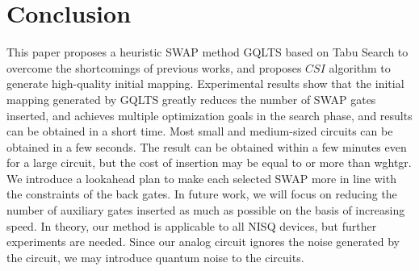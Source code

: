 \documentclass[runningheads]{llncs}
\begin{document}
 \section{Conclusion}
 \label{Conclusion}
 This paper proposes a heuristic SWAP method GQLTS based on Tabu Search to 
 overcome the shortcomings of previous works, 
 and proposes $CSI$  algorithm to generate high-quality initial mapping. 
 Experimental results show that the initial mapping generated by GQLTS greatly 
 reduces the number of SWAP gates inserted, 
 and achieves multiple optimization goals in the search phase, 
 and results can be obtained in a short time. 
 Most small and medium-sized circuits can be obtained in a few seconds. 
 The result can be obtained within a few minutes even for a large circuit, 
 but the cost of insertion may be equal to or more than wghtgr. 
 We introduce a lookahead plan to make each selected SWAP more in line with the 
 constraints of the back gates. 
 In future work, we will focus on reducing the number of auxiliary gates inserted as much as possible 
 on the basis of increasing speed. 
 In theory, our method is applicable to all NISQ devices, 
 but further experiments are needed. 
Since our analog circuit ignores the noise generated by the circuit,
we may introduce quantum noise to the circuits.
\appendix
\end{document}
